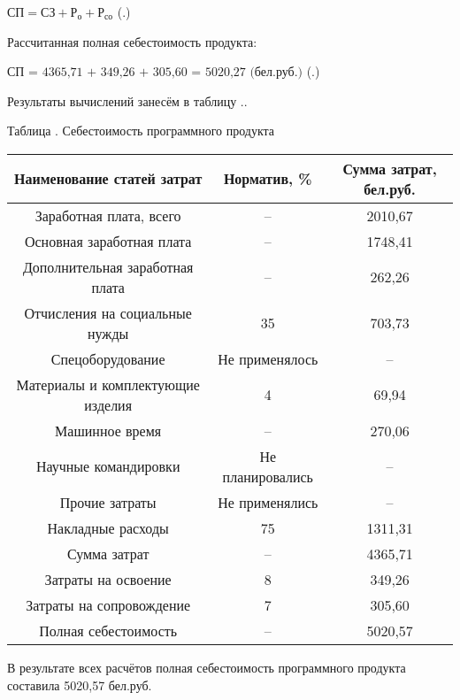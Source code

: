 {	\formulaspace \par \redline 
		$\textrm{СП} = \textrm{СЗ} + \textrm{Р}_{\textrm{о}} + \textrm{Р}_{\textrm{со}}$
	\hfill (\thechaptercntr .\theformulacntr) \redline
	\formulaspace \addtocounter{formulacntr}{1}

	\par \redline Рассчитанная полная себестоимость продукта:

	\formulaspace \par \redline 
		$\textrm{СП = 4365,71 + 349,26 + 305,60 = 5020,27 (бел.руб.)}$
	\hfill (\thechaptercntr .\theformulacntr) \redline
	\formulaspace 

	\par \redline Результаты вычислений занесём в таблицу \thechaptercntr .\thetablecntr.

	\formulaspace
	\begin{flushleft}
		\par \centering Таблица \thechaptercntr .\thetablecntr \spc {--} Себестоимость программного продукта
	\end{flushleft}
	{\begin{Center}
	\begin{tabular}{|c|c|c|}
		\hline
		Наименование статей затрат & Норматив, \% & Сумма затрат, бел.руб. \\ \hline
		Заработная плата, всего & {--} & 2010,67 \\ \hline
		Основная заработная плата & {--} & 1748,41 \\ \hline
		Дополнительная заработная плата & {--} & 262,26 \\ \hline
		Отчисления на социальные нужды & 35 & 703,73 \\ \hline
		Спецоборудование & Не применялось & {--} \\ \hline
		Материалы и комплектующие изделия & 4 & 69,94 \\ \hline
		Машинное время & {--} & 270,06 \\ \hline
		Научные командировки & Не планировались & {--} \\ \hline
		Прочие затраты & Не применялись & {--} \\ \hline
		Накладные расходы & 75 & 1311,31 \\ \hline
		Сумма затрат & {--} & 4365,71 \\ \hline
		Затраты на освоение & 8 & 349,26 \\ \hline
		Затраты на сопровождение & 7 & 305,60 \\ \hline
		Полная себестоимость & {--} & 5020,57 \\ \hline
	\end{tabular} \addtocounter{tablecntr}{1}
	\end{Center}}
	\formulaspace 
	
	\par \redline В результате всех расчётов полная себестоимость программного продукта составила 5020,57 бел.руб. 
}



